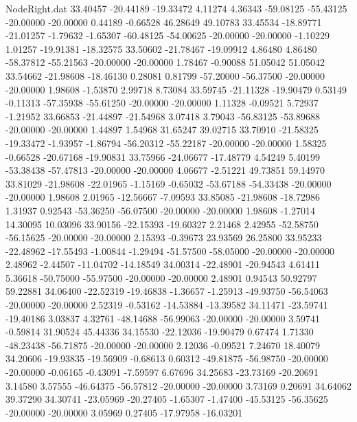\begin{filecontents}{NodeRight.dat}
  33.40457  -20.44189  -19.33472     4.11274    4.36343  -59.08125  -55.43125  -20.00000  -20.00000    0.44189   -0.66528   46.28649   49.10783
  33.45534  -18.89771  -21.01257    -1.79632   -1.65307  -60.48125  -54.00625  -20.00000  -20.00000   -1.10229    1.01257  -19.91381  -18.32575
  33.50602  -21.78467  -19.09912     4.86480    4.86480  -58.37812  -55.21563  -20.00000  -20.00000    1.78467   -0.90088   51.05042   51.05042
  33.54662  -21.98608  -18.46130     0.28081    0.81799  -57.20000  -56.37500  -20.00000  -20.00000    1.98608   -1.53870    2.99718    8.73084
  33.59745  -21.11328  -19.90479     0.53149   -0.11313  -57.35938  -55.61250  -20.00000  -20.00000    1.11328   -0.09521    5.72937   -1.21952
  33.66853  -21.44897  -21.54968     3.07418    3.79043  -56.83125  -53.89688  -20.00000  -20.00000    1.44897    1.54968   31.65247   39.02715
  33.70910  -21.58325  -19.33472    -1.93957   -1.86794  -56.20312  -55.22187  -20.00000  -20.00000    1.58325   -0.66528  -20.67168  -19.90831
  33.75966  -24.06677  -17.48779     4.54249    5.40199  -53.38438  -57.47813  -20.00000  -20.00000    4.06677   -2.51221   49.73851   59.14970
  33.81029  -21.98608  -22.01965    -1.15169   -0.65032  -53.67188  -54.33438  -20.00000  -20.00000    1.98608    2.01965  -12.56667   -7.09593
  33.85085  -21.98608  -18.72986     1.31937    0.92543  -53.36250  -56.07500  -20.00000  -20.00000    1.98608   -1.27014   14.30095   10.03096
  33.90156  -22.15393  -19.60327     2.21468    2.42955  -52.58750  -56.15625  -20.00000  -20.00000    2.15393   -0.39673   23.93569   26.25800
  33.95233  -22.48962  -17.55493    -1.00844   -1.29494  -51.57500  -58.05000  -20.00000  -20.00000    2.48962   -2.44507  -11.04702  -14.18549
  34.00314  -22.48901  -20.94543     4.61411    5.36618  -50.75000  -55.97500  -20.00000  -20.00000    2.48901    0.94543   50.92797   59.22881
  34.06400  -22.52319  -19.46838    -1.36657   -1.25913  -49.93750  -56.54063  -20.00000  -20.00000    2.52319   -0.53162  -14.53884  -13.39582
  34.11471  -23.59741  -19.40186     3.03837    4.32761  -48.14688  -56.99063  -20.00000  -20.00000    3.59741   -0.59814   31.90524   45.44336
  34.15530  -22.12036  -19.90479     0.67474    1.71330  -48.23438  -56.71875  -20.00000  -20.00000    2.12036   -0.09521    7.24670   18.40079
  34.20606  -19.93835  -19.56909    -0.68613    0.60312  -49.81875  -56.98750  -20.00000  -20.00000   -0.06165   -0.43091   -7.59597    6.67696
  34.25683  -23.73169  -20.20691     3.14580    3.57555  -46.64375  -56.57812  -20.00000  -20.00000    3.73169    0.20691   34.64062   39.37290
  34.30741  -23.05969  -20.27405    -1.65307   -1.47400  -45.53125  -56.35625  -20.00000  -20.00000    3.05969    0.27405  -17.97958  -16.03201

\end{filecontents}
